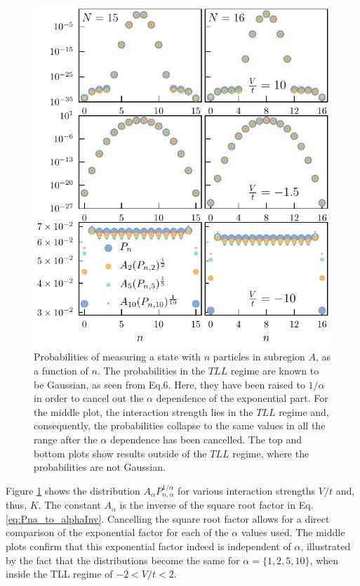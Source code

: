 \begin{figure}[htp]
\begin{center}
\includegraphics[width=1.0\columnwidth]{alphaCollapse.pdf}
\end{center}
\caption{Probabilities of measuring a state with $n$ particles in subregion $A$, as  a function of $n$. The probabilities in the $TLL$ regime are known to be Gaussian, as seen from Eq.6. Here, they have been raised to $1/\alpha$ in order to cancel out the $\alpha$ dependence of the exponential part. For the middle plot, the interaction strength lies in the $TLL$ regime and, consequently, the probabilities collapse to the same values in all the range after the $\alpha$ dependence has been cancelled. The top and bottom plots show results outside of the $TLL$ regime, where the probabilities are not Gaussian.}
\label{fig:alpha_collapse}
\end{figure}
 
 Figure \ref{fig:alpha_collapse} shows the distribution $A_{\alpha} P_{n,\alpha}^{1/\alpha}$ for various interaction strengths $V/t$ and, thus, $K$. The constant $A_{\alpha}$ is the inverse of the square root factor in Eq. \ref{eq:Pna_to_alphaInv}. Cancelling the square root factor allows for a direct comparison of the exponential factor for each of the $\alpha$ values used. The middle plots confirm that this exponential factor indeed is independent of $\alpha$, illustrated by the fact that the distributions become the same for $\alpha=\{1,2,5,10\}$, when inside the TLL regime of $-2 < V/t < 2$.
 
